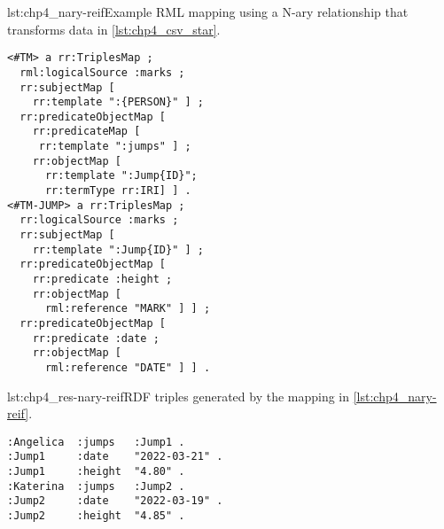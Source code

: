 \begin{minipage}{\linewidth}
\begin{captionedlisting}{lst:chp4_nary-reif}{Example RML mapping using a N-ary relationship that transforms data in \cref{lst:chp4_csv_star}.}
\centering
\begin{multicols}{2}
{\begin{lstlisting}[basicstyle=\ttfamily\small,label={list:example1},columns=flexible]
<#TM> a rr:TriplesMap ;
  rml:logicalSource :marks ;
  rr:subjectMap [ 
    rr:template ":{PERSON}" ] ;
  rr:predicateObjectMap [ 
    rr:predicateMap [
     rr:template ":jumps" ] ;
    rr:objectMap [
      rr:template ":Jump{ID}";
      rr:termType rr:IRI] ] .
<#TM-JUMP> a rr:TriplesMap ;
  rr:logicalSource :marks ;
  rr:subjectMap [ 
    rr:template ":Jump{ID}" ] ;
  rr:predicateObjectMap [ 
    rr:predicate :height ;
    rr:objectMap [
      rml:reference "MARK" ] ] ;
  rr:predicateObjectMap [ 
    rr:predicate :date ;
    rr:objectMap [
      rml:reference "DATE" ] ] .
\end{lstlisting}}
\end{multicols}
\end{captionedlisting}
\end{minipage}

\begin{minipage}{\linewidth}
\begin{captionedlisting}{lst:chp4_res-nary-reif}{RDF triples generated by the mapping in \cref{lst:chp4_nary-reif}.}
\centering
\begin{multicols}{2}
{\begin{lstlisting}[basicstyle=\ttfamily\small,label={list:example1},columns=flexible]
:Angelica  :jumps   :Jump1 .
:Jump1     :date    "2022-03-21" .
:Jump1     :height  "4.80" .
:Katerina  :jumps   :Jump2 .
:Jump2     :date    "2022-03-19" .
:Jump2     :height  "4.85" .
\end{lstlisting}}
\end{multicols}
\end{captionedlisting}
\end{minipage}